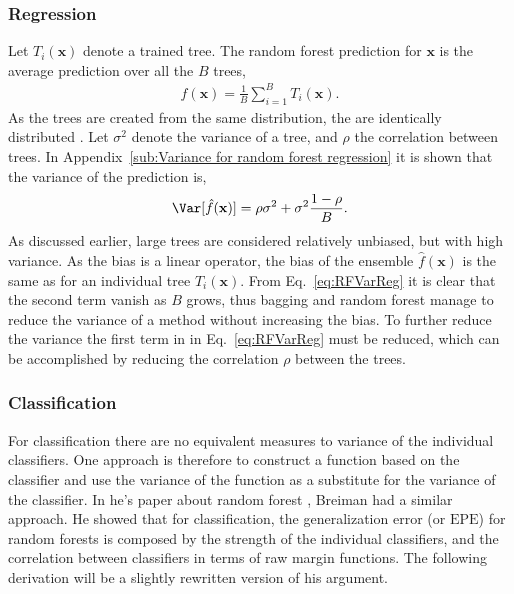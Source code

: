 \subsubsection{Regression}
\label{sub:Regression}

Let $T_i(\mathbf{x})$ denote a trained tree. The random forest prediction for $\mathbf{x}$ is the average prediction over all the $B$ trees,
\begin{align}
  \hat f(\mathbf{x}) = \frac{1}{B} \sum_{i = 1}^{B} T_i(\mathbf{x}).
\end{align}
As the trees are created from the same distribution, the are identically distributed . Let $\sigma^2$ denote the variance of a tree, and $\rho$ the correlation between trees. In Appendix~\ref{sub:Variance for random forest regression} it is shown that the variance of the prediction is, 
\begin{align}
\label{eq:RFVarReg} 
  \Var[\hat f(\mathbf{x})] = \rho \sigma^2 + \sigma^2 \frac{1-\rho}{B}.
\end{align}
As discussed earlier, large trees are considered relatively unbiased, but with high variance. As the bias is a linear operator, the bias of the ensemble $\hat f(\mathbf{x})$ is the same as for an individual tree $T_i(\mathbf{x})$. From Eq.~\eqref{eq:RFVarReg} it is clear that the second term vanish as $B$ grows, thus bagging and random forest manage to reduce the variance of a method without increasing the bias. To further reduce the variance the first term in in Eq.~\eqref{eq:RFVarReg} must be reduced, which can be accomplished by reducing the correlation $\rho$ between the trees. 

\subsubsection{Classification}
\label{sub:Classification}
For classification there are no equivalent measures to variance of the individual classifiers. One approach is therefore to construct a function based on the classifier and use the variance of the function as a substitute for the variance of the classifier. 
In he's paper about random forest \cite{randomforests}, Breiman had a similar approach. He showed that for classification, the generalization error (or $\mathrm{EPE}$) for random forests is composed by the strength of the individual classifiers, and the correlation between classifiers in terms of raw margin functions. 
The following derivation will be a slightly rewritten version of his argument.

